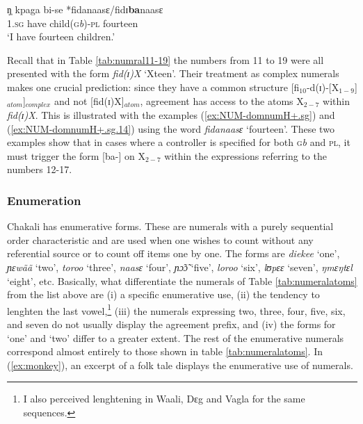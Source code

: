 \begin{exe}
\begin{exe}
\begin{exe}
{\begin{exe}
\begin{exe}
\begin{exe}
\begin{exe}
\begin{exe}
\begin{exe}
\begin{exe}
\begin{xlist}
\begin{exe}
\begin{exe}
\begin{exe}
\ex\label{ex:NUM-domnumH+.sg.14}
\gll    ŋ̩  kpaga  bi-se *fidanaasɛ/fidɪ{\bf ba}naasɛ \\
       \textsc{1.sg}  {have}  {child(\textsc{g}\textit{b})-\textsc{pl}}  
{fourteen} \\
\glt `I have fourteen children.' \\
\z
\z

Recall that in Table \ref{tab:numral11-19} the numbers from 11 to 19 were all
presented with the form
{\it  fid(ɪ)X}    `Xteen'. Their treatment as complex numerals makes one crucial
prediction: since they   have a common structure
[fi$_{10}$-d(ɪ)-[X$_{1-9}$]$_{atom}$]$_{complex}$ and not [fid(ɪ)X]$_{atom}$,
 agreement   has
access to the atoms X$_{2-7}$ within {\it fid(ɪ)X}. This is
illustrated with the examples (\ref{ex:NUM-domnumH+.sg}) and
(\ref{ex:NUM-domnumH+.sg.14}) using the word {\it fidanaasɛ}
`fourteen'.
These two examples show that in cases where a controller is specified for
both \textsc{g}{\it b} and \textsc{pl}, it must trigger the form
[ba-] on X$_{2-7}$   within the expressions referring to the numbers 12-17.



\subsubsection{Enumeration}
\label{sec:NUM-enum}

Chakali has enumerative forms. These  are numerals
with a purely sequential order characteristic and are used when one wishes
to count without 
any referential source or  to count off items one by one.  The forms are {\it 
diekee} `one',
{\it ɲɛwãã} `two', {\it toroo} `three', {\it naasɛ} `four',  {\it ɲɔ̃ɔ̃} 
`five',
{\it loroo} `six', {\it lʊpɛɛ} `seven', {\it ŋmɛŋtɛl} `eight', etc. Basically, 
what
differentiate the numerals of Table \ref{tab:numeralatoms} from the list above
are (i) a specific enumerative use, (ii) the tendency to lenghten the last
vowel,\footnote{I also perceived lenghtening  in Waali, Dɛg and
Vagla for the
same
sequences.} (iii)  the numerals  expressing two, three, four, five,
six, and seven do not usually display the agreement prefix,  and
(iv) the forms for `one'
and `two' differ to a greater extent. The rest of the enumerative numerals
correspond almost entirely to those shown in table
\ref{tab:numeralatoms}.  In (\ref{ex:monkey}), an excerpt of a folk tale
displays the
enumerative use of numerals.

\begin{exe}
 \ex\label{ex:monkey}


\end{exe}
\end{exe}
\end{exe}
\end{exe}
\end{xlist}
\end{exe}
\end{exe}
\end{exe}
\end{exe}
\end{exe}
\end{exe}
\end{exe}}
\end{exe}
\end{exe}
\end{exe}
